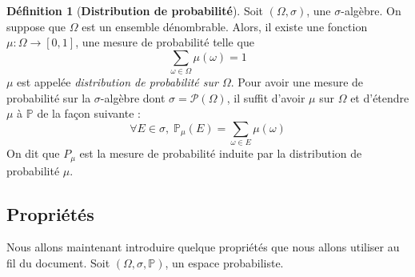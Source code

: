 \documentclass[12pt,a4paper]{report}
\theoremstyle{definition}%
\newtheorem{definition}{Définition}[chapter]
\theoremstyle{remark}
\newcommand{\pr}{\mathbb{P}}
\begin{document}
\begin{definition}[\textbf{Distribution de probabilité}] \label{distriprobadef}
	Soit $(\Omega, \sigma)$, une $\sigma$-algèbre.
	On suppose que $\Omega$ est un ensemble dénombrable. Alors, il existe une fonction $\mu: \Omega \rightarrow [0,1]$, une mesure de probabilité telle que
	\[\sum_{\omega \in \Omega} \mu(\omega) =1 \]
	$\mu$ est appelée \textit{distribution de probabilité sur $\Omega$}. Pour avoir une mesure de probabilité sur la $\sigma$-algèbre dont $\sigma = \mathcal{P}(\Omega)$, il suffit d'avoir $\mu$ sur $\Omega$ et d'étendre $\mu$ à $\pr$ de la façon suivante :
	\[ \forall E \in \sigma,\; \mathbb{P}_{\mu}(E) = \sum_{\omega \in E} \mu(\omega)\] On dit que $P_{\mu}$ est la mesure de probabilité induite par la distribution de probabilité $\mu$.
\end{definition}

\subsection*{Propriétés}
	Nous allons maintenant introduire quelque propriétés que nous allons utiliser au fil du document.
	Soit $(\Omega, \sigma, \mathbb{P})$, un espace probabiliste.
\end{document}

